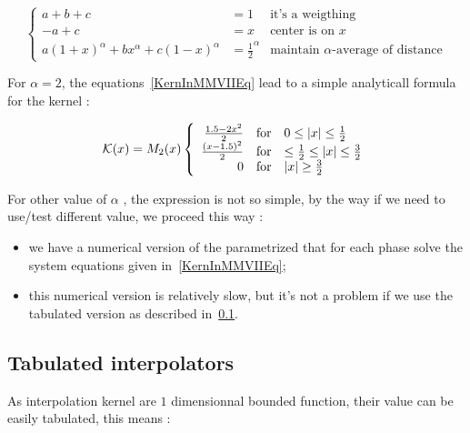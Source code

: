 \begin{equation}
\left\{ \begin{array}{rc|l}
  a+b+c        &    = 1  &  \textrm{it's a weigthing}  \\ 
  -a+c      &       = x &   \textrm{center is on } x \\
  a(1+x)^\alpha        + b x^\alpha +c(1-x)^\alpha & = \frac{1}{2} ^{\alpha} &  \textrm{maintain } \alpha  \textrm{-average of distance}
\end{array}\right.
\label{KernInMMVIIEq}
\end{equation}

For $\alpha=2$, the equations~\ref{KernInMMVIIEq} lead to a simple analyticall formula for the kernel :


\begin{equation}
\mathcal K(x) = M_2(x)
\left\{ \begin{array}{rcl}
\frac{1.5-2x^2}{2}       &   \mbox{for} &  0 \leq |x| \leq \frac{1}{2} \\ 
\frac{(x-1.5)^2}{2}       &   \mbox{for} &  \leq \frac{1}{2} \leq |x| \leq \frac{3}{2} \\ 
0                             &   \mbox{for} &  |x| \geq \frac{3}{2}
\end{array}\right.
\label{KernInMMVII2Eq}
\end{equation}

For other value of $\alpha$ , the expression is not so simple, by the way if we need to use/test 
different value, we proceed this way :

\begin{itemize}
     \item we have a numerical version of the parametrized that for each phase solve the system 
           equations given in~\ref{KernInMMVIIEq};
     \item this numerical version  is relatively slow, but it's not a problem if we use the
           tabulated version as described in~\ref{InterpolTabul}.
\end{itemize}


\subsection{Tabulated interpolators}
\label{InterpolTabul}


As interpolation  kernel are $1$ dimensionnal bounded function, their value can be easily tabulated, this
means :

